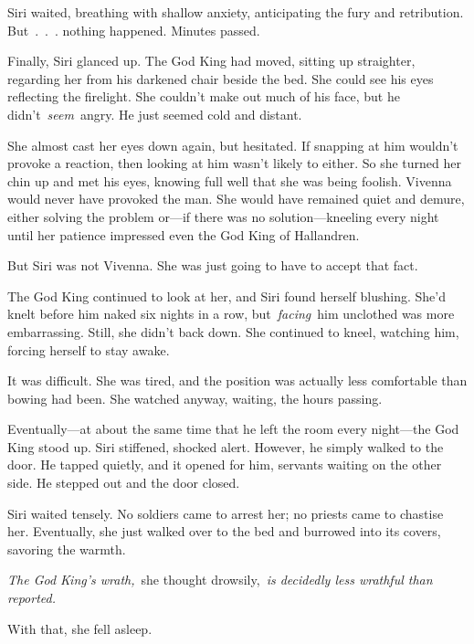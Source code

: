 Siri waited, breathing with shallow anxiety, anticipating the fury and retribution. But~.~.~. nothing happened. Minutes passed.

Finally, Siri glanced up. The God King had moved, sitting up straighter, regarding her from his darkened chair beside the bed. She could see his eyes reflecting the firelight. She couldn’t make out much of his face, but he didn’t~\textit{seem}~angry. He just seemed cold and distant.

She almost cast her eyes down again, but hesitated. If snapping at him wouldn’t provoke a reaction, then looking at him wasn’t likely to either. So she turned her chin up and met his eyes, knowing full well that she was being foolish. Vivenna would never have provoked the man. She would have remained quiet and demure, either solving the problem or—if there was no solution—kneeling every night until her patience impressed even the God King of Hallandren.

But Siri was not Vivenna. She was just going to have to accept that fact.

The God King continued to look at her, and Siri found herself blushing. She’d knelt before him naked six nights in a row, but~\textit{facing}~him unclothed was more embarrassing. Still, she didn’t back down. She continued to kneel, watching him, forcing herself to stay awake.

It was difficult. She was tired, and the position was actually less comfortable than bowing had been. She watched anyway, waiting, the hours passing.

Eventually—at about the same time that he left the room every night—the God King stood up. Siri stiffened, shocked alert. However, he simply walked to the door. He tapped quietly, and it opened for him, servants waiting on the other side. He stepped out and the door closed.

Siri waited tensely. No soldiers came to arrest her; no priests came to chastise her. Eventually, she just walked over to the bed and burrowed into its covers, savoring the warmth.

\textit{The God King’s wrath,}~she thought drowsily,~\textit{is decidedly less wrathful than reported.}

With that, she fell asleep.

